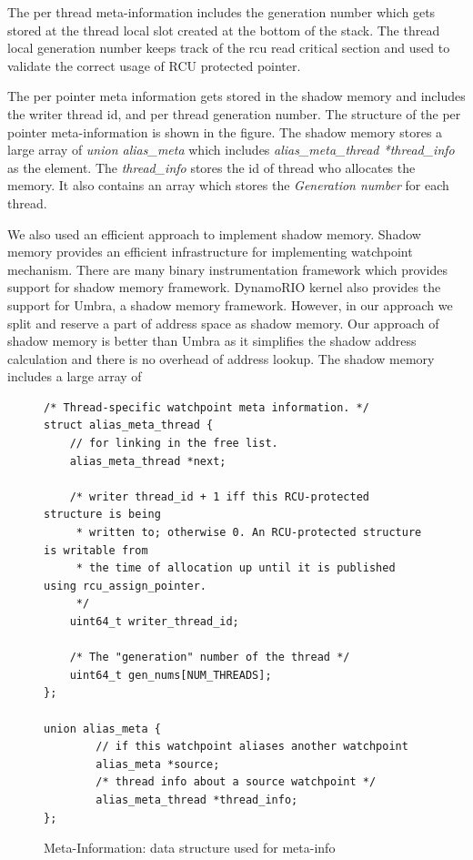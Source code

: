 The per thread meta-information includes the generation number which gets stored at the thread local slot created at the bottom of the stack. The thread local generation number keeps track of the rcu read critical section and used to validate the correct usage of RCU protected pointer. 



The per pointer meta information gets stored in the shadow memory and includes the writer thread id, and per thread generation number. The structure of the per pointer meta-information is shown in the figure. The shadow memory stores a large array of \emph{union alias\_meta} which includes \emph{ alias\_meta\_thread *thread\_info} as the element. The \emph{thread\_info} stores the id of thread who allocates the memory. It also contains an array which stores the \emph{Generation number} for each thread. 

We also used an efficient approach to implement shadow memory. Shadow memory provides an efficient infrastructure for implementing watchpoint mechanism. There are many binary instrumentation framework which provides support for shadow memory framework. DynamoRIO kernel also provides the support for Umbra, a shadow memory framework. However, in our approach we split and reserve a part of address space as shadow memory. Our approach of shadow memory is better than Umbra as it simplifies the shadow address calculation and there is no overhead of address lookup. The shadow memory includes a large array of 

\begin{figure}[h]
\begin{lstlisting}
/* Thread-specific watchpoint meta information. */
struct alias_meta_thread {
    // for linking in the free list.
    alias_meta_thread *next;

    /* writer thread_id + 1 iff this RCU-protected structure is being
     * written to; otherwise 0. An RCU-protected structure is writable from
     * the time of allocation up until it is published using rcu_assign_pointer.
     */
    uint64_t writer_thread_id;

    /* The "generation" number of the thread */
    uint64_t gen_nums[NUM_THREADS];
};

union alias_meta {
        // if this watchpoint aliases another watchpoint
        alias_meta *source;
        /* thread info about a source watchpoint */
        alias_meta_thread *thread_info;
}; 
\end{lstlisting}
\caption{Meta-Information: data structure used for meta-info}\label{fig:metainfo}
\end{figure}

